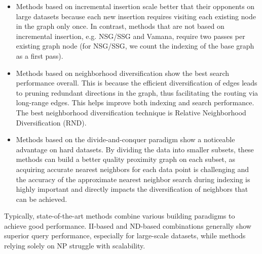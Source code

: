 \begin{itemize}
    \item Methods based on incremental insertion scale better that their opponents on large datasets because each new insertion requires visiting each existing node in the graph only once. In contrast, methods that are not based on incremental insertion, e.g. NSG/SSG and Vamana, require two passes per existing graph node (for NSG/SSG, we count the indexing of the base graph as a first pass).
    \item Methods based on neighborhood diversification show the best search performance overall. This is because the efficient diversification of edges leads to pruning redundant directions in the graph,  thus facilitating the routing via long-range edges. This helps improve both indexing and search performance. The best neighborhood diversification technique is Relative Neighborhood Diversification (RND).
    \item Methods based on the divide-and-conquer paradigm show a noticeable advantage on hard datasets. By dividing the data into smaller subsets, these methods can build a better quality proximity graph on each subset, as acquiring accurate nearest neighbors for each data point is challenging and the accuracy of the approximate nearest neighbor search during indexing is highly important and directly impacts the diversification of neighbors that can be achieved.

    
    
\end{itemize}

Typically, state-of-the-art methods combine various building paradigms to achieve good performance. II-based and ND-based combinations generally show superior query performance, especially for large-scale datasets, while methods relying solely on NP struggle with scalability.

